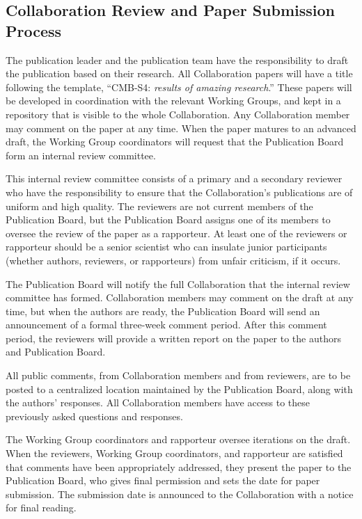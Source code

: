 \documentclass[12pt]{article}
\newcommand\collabname{CMB-S4}
\begin{document}
\subsection{Collaboration Review and Paper Submission Process}

The publication leader and the publication team have the responsibility to draft the publication based on their research.  All Collaboration papers will have a title following the template, ``\collabname: \textit{results of amazing research}.''  These papers will be developed in coordination with the relevant Working Groups, and kept in a repository that is visible to the whole Collaboration.  Any Collaboration member may comment on the paper at any time.  When the paper matures to an advanced draft, the Working Group coordinators will request that the Publication Board form an internal review committee.

This internal review committee consists of a primary and a secondary reviewer who have the responsibility to ensure that the Collaboration's publications are of uniform and high quality.  The reviewers are not current members of the Publication Board, but the Publication Board assigns one of its members to oversee the review of the paper as a rapporteur.  At least one of the reviewers or rapporteur should be a senior scientist who can insulate junior participants (whether authors, reviewers, or rapporteurs) from unfair criticism, if it occurs.

The Publication Board will notify the full Collaboration that the internal review committee has formed.  Collaboration members may comment on the draft at any time, but when the authors are ready, the Publication Board will send an announcement of a formal three-week comment period. After this comment period, the reviewers will provide a written report on the paper to the authors and Publication Board.

All public comments, from Collaboration members and from reviewers, are to be posted to a centralized location maintained by the Publication Board, along with the authors' responses. All Collaboration members have access to these previously asked questions and responses.

The Working Group coordinators and rapporteur oversee iterations on the draft.  When the reviewers, Working Group coordinators, and rapporteur are satisfied that comments have been appropriately addressed, they present the paper to the Publication Board, who gives final permission and sets the date for paper submission.  The submission date is announced to the Collaboration with a notice for final reading.
\end{document}

